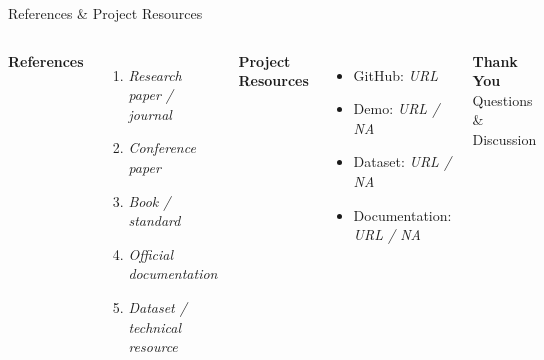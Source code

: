 \documentclass[aspectratio=169,11pt]{beamer}
\newcommand{\placeholder}[1]{%
\textit{\color{GEUGrey}#1}
}
\begin{document}
\begin{frame}{References \& Project Resources}

\begin{columns}[T,totalwidth=\textwidth]


\textbf{\color{GEUBlue}References}

\begin{enumerate}\itemsep3pt
    \item \placeholder{Research paper / journal}
    \item \placeholder{Conference paper}
    \item \placeholder{Book / standard}
    \item \placeholder{Official documentation}
    \item \placeholder{Dataset / technical resource}
\end{enumerate}


\textbf{\color{GEUBlue}Project Resources}

\begin{itemize}\itemsep3pt
    \item GitHub: \placeholder{URL}
    \item Demo: \placeholder{URL / NA}
    \item Dataset: \placeholder{URL / NA}
    \item Documentation: \placeholder{URL / NA}
\end{itemize}

\vfill

\begin{center}

\colorbox{GEUBlue}{
\parbox{.82\textwidth}{
\centering
\color{white}
\Large\textbf{Thank You}\\[1mm]
\normalsize Questions \& Discussion
}}

\end{center}

\end{columns}

\end{frame}
\end{document}
